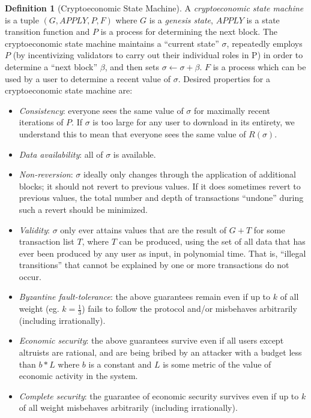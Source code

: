 \documentclass[11pt,a4paper]{report}
\theoremstyle{plain}
\theoremstyle{definition}
\newtheorem{defn}{Definition}[chapter]
\theoremstyle{remark}
\begin{document}
\begin{defn}[Cryptoeconomic State Machine]
A \emph{cryptoeconomic state machine} is a tuple $(G, APPLY, P, F)$ where $G$ is a \emph{genesis state}, $APPLY$ is a state transition function and $P$ is a process for determining the next block. The cryptoeconomic state machine maintains a ``current state'' $\sigma$, repeatedly employs $P$ (by incentivizing validators to carry out their individual roles in P) in order to determine a ``next block'' $\beta$, and then sets $\sigma \leftarrow \sigma + \beta$. $F$ is a process which can be used by a user to determine a recent value of $\sigma$. Desired properties for a cryptoeconomic state machine are:

\begin{itemize}
\item
\emph{Consistency}: everyone sees the same value of $\sigma$ for maximally recent iterations of $P$. If $\sigma$ is too large for any user to download in its entirety, we understand this to mean that everyone sees the same value of $R(\sigma)$.
\item
\emph{Data availability}: all of $\sigma$ is available.
\item
\emph{Non-reversion}: $\sigma$ ideally only changes through the application of additional blocks; it should not revert to previous values. If it does sometimes revert to previous values, the total number and depth of transactions ``undone'' during such a revert should be minimized.
\item
\emph{Validity}: $\sigma$ only ever attains values that are the result of $G + T$ for some transaction list $T$, where $T$ can be produced, using the set of all data that has ever been produced by any user as input, in polynomial time. That is, ``illegal transitions'' that cannot be explained by one or more transactions do not occur.
\item
\emph{Byzantine fault-tolerance}: the above guarantees remain even if up to $k$ of all weight (eg. $k = \frac{1}{3}$) fails to follow the protocol and/or misbehaves arbitrarily (including irrationally).
\item
\emph{Economic security}: the above guarantees survive even if all users except altruists are rational, and are being bribed by an attacker with a budget less than $b * L$ where $b$ is a constant and $L$ is some metric of the value of economic activity in the system.
\item
\emph{Complete security}: the guarantee of economic security survives even if up to $k$ of all weight misbehaves arbitrarily (including irrationally).
\end{itemize}
\end{defn}
\end{document}
